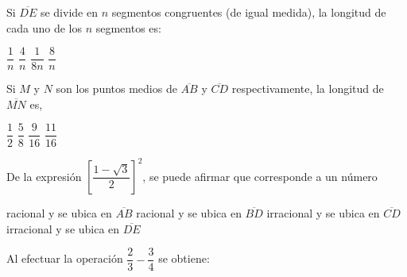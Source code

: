 \documentclass[10pt,letterpaper,addpoints]{exam}
\begin{document}
\begin{multicols}{2}
\begin{questions}
\begin{center}
\end{center}
\question \label{firstq}Si $\overline{DE}$ se divide en $n$ segmentos congruentes (de igual medida), la longitud de cada uno de los $n$ segmentos es:
\begin{choices}
\begin{multicols}{2}
\choice $\dfrac{1}{n}$
\choice $\dfrac{4}{n}$
\CorrectChoice $\dfrac{1}{8n}$
\choice $\dfrac{8}{n}$
\end{multicols}
\end{choices}
\question Si $M$ y $N$ son los puntos medios de $\overline{AB}$ y $\overline{CD}$ respectivamente, la longitud de $\overline{MN}$ es,
\begin{choices}
\begin{multicols}{2}
 \choice $\dfrac{1}{2}$
 \choice $\dfrac{5}{8}$
 \choice $\dfrac{9}{16}$
 \CorrectChoice $\dfrac{11}{16}$
\end{multicols}
\end{choices}
\question \label{lastq} De la expresión $\left[\dfrac{1-\sqrt{3}}{2}\right]^{2}$, se puede afirmar que corresponde a un número
\begin{choices}
 \choice racional y se ubica en $\overline{AB}$
 \choice racional y se ubica en $\overline{BD}$
 \choice irracional y se ubica en $\overline{CD}$
 \CorrectChoice irracional y se ubica en $\overline{DE}$
\end{choices}
\question Al efectuar la operación $\dfrac{2}{3}-\dfrac{3}{4}$ se obtiene:


\end{questions}
\end{multicols}
\end{document}
